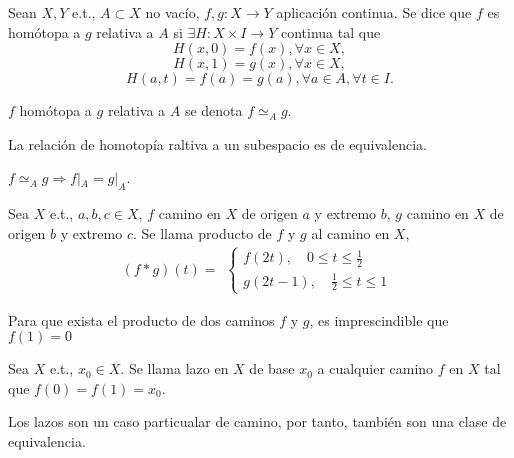 \begin{defn}
  Sean $X, Y$ e.t., $A \subset X$ no vacío, $f,g : X \to Y$ aplicación continua. Se dice que $f$ es homótopa a $g$ relativa a $A$ si $\exists H : X \times I \to Y$ continua tal que
  \[ 
    H(x,0) = f(x), \forall x \in X,
  \] 
  \[ 
    H(x,1) = g(x), \forall x \in X,
  \] 
  \[ 
    H(a,t) = f(a) = g(a), \forall a \in A, \forall t \in I.
  \] 
\end{defn}

\begin{nota}
  $f$ homótopa a $g$ relativa a $A$ se denota $f \simeq_{A} g$.
\end{nota}

\begin{obs}
  La relación de homotopía raltiva a un subespacio es de equivalencia.
\end{obs}

\begin{obs}
  $f \simeq_{A} g \Rightarrow f|_{A} = g|_{A}$.
\end{obs}

\begin{defn}[Producto]
  Sea $X$ e.t., $a, b, c \in X$, $f$ camino en $X$ de origen $a$ y extremo $b$, $g$ camino en $X$ de origen $b$ y extremo $c$. Se llama producto de $f$ y $g$ al camino en $X$,
  \[ 
    (f * g)(t) =
    \begin{aligned}
      \begin{cases}
        f(2t), \quad 0 \leq t \leq \frac{1}{2} \\
        g(2t - 1), \quad \frac{1}{2} \leq t \leq 1
      \end{cases}
    \end{aligned} 
  \] 
\end{defn}

\begin{obs}
  Para que exista el producto de dos caminos $f$ y $g$, es imprescindible que $f(1) = 0$
\end{obs}

\begin{defn}[Lazo]
  Sea $X$ e.t., $x_{0} \in X$. Se llama lazo en $X$ de base $x_{0}$ a cualquier camino $f$ en $X$ tal que $f(0) = f(1) = x_{0}$.
\end{defn}

\begin{obs}
  Los lazos son un caso particualar de camino, por tanto, también son una clase de equivalencia.
\end{obs}

